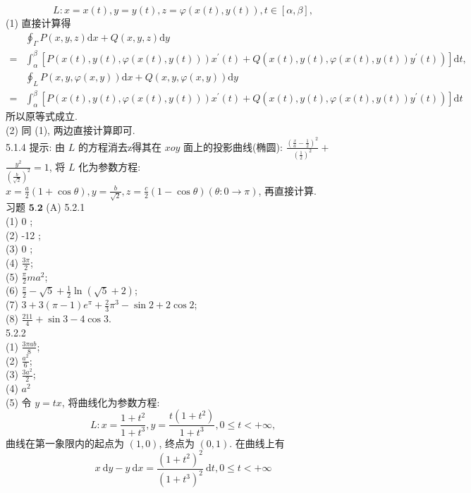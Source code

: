 \documentclass[a4paper,11pt,UTF8]{article}
\begin{document}
$$
L: x=x(t), y=y(t), z=\varphi(x(t), y(t)), t \in[\alpha, \beta],
$$
(1) 直接计算得
$$
\begin{aligned}
	& \oint_{\Gamma} P(x, y, z) \mathrm{d} x+Q(x, y, z) \mathrm{d} y \\
	= & \int_\alpha^\beta\left[P(x(t), y(t), \varphi(x(t), y(t))) x^{\prime}(t)+Q\left(x(t), y(t), \varphi(x(t), y(t)) y^{\prime}(t)\right)\right] \mathrm{d} t,
\end{aligned}
$$
$$
\begin{aligned}
	& \oint_L P(x, y, \varphi(x, y)) \mathrm{d} x+Q(x, y, \varphi(x, y)) \mathrm{d} y \\
	= & \int_\alpha^\beta\left[P(x(t), y(t), \varphi(x(t), y(t))) x^{\prime}(t)+Q\left(x(t), y(t), \varphi(x(t), y(t)) y^{\prime}(t)\right)\right] \mathrm{d} t
\end{aligned}
$$
所以原等式成立.\\
(2) 同 (1), 两边直接计算即可.\\
5.1.4 提示: 由 $L$ 的方程消去z得其在 $x o y$ 面上的投影曲线(椭圆): $\frac{\left(\frac{x}{a}-\frac{1}{2}\right)^2}{\left(\frac{1}{2}\right)^2}+$ $\frac{y^2}{\left(\frac{b}{\sqrt{2}}\right)^2}=1$, 将 $L$ 化为参数方程: $x=\frac{a}{2}(1+\cos \theta), y=\frac{b}{\sqrt{2}}, z=\frac{c}{2}(1-\cos \theta)(\theta: 0 \rightarrow \pi)$, 再直接计算.\\
习题 $\mathbf{5 . 2}$
(A)
5.2.1\\
(1) 0 ;\\
(2) -12 ;\\
(3) 0 ;\\
(4) $\frac{3 \pi}{2}$;\\
(5) $\frac{\pi}{2} m a^2$;\\
(6) $\frac{\pi}{2}-\sqrt{5}+\frac{1}{2} \ln (\sqrt{5}+2)$;\\
(7) $3+3(\pi-1) e^\pi+\frac{2}{3} \pi^3-\sin 2+2 \cos 2$;\\
(8) $\frac{211}{4}+\sin 3-4 \cos 3$.\\
5.2.2\\
(1) $\frac{3 \pi a b}{8}$;\\
(2) $\frac{a^2}{6}$;\\
(3) $\frac{3 a^2}{2}$;\\
(4) $a^2$\\
(5) 令 $y=t x$, 将曲线化为参数方程:\\
$$
L: x=\frac{1+t^2}{1+t^3}, y=\frac{t\left(1+t^2\right)}{1+t^3}, 0 \leq t<+\infty,
$$
曲线在第一象限内的起点为 $(1,0)$, 终点为 $(0,1)$. 在曲线上有
$$
x \mathrm{~d} y-y \mathrm{~d} x=\frac{\left(1+t^2\right)^2}{\left(1+t^3\right)^2} \mathrm{~d} t, 0 \leq t<+\infty
$$
\end{document}
